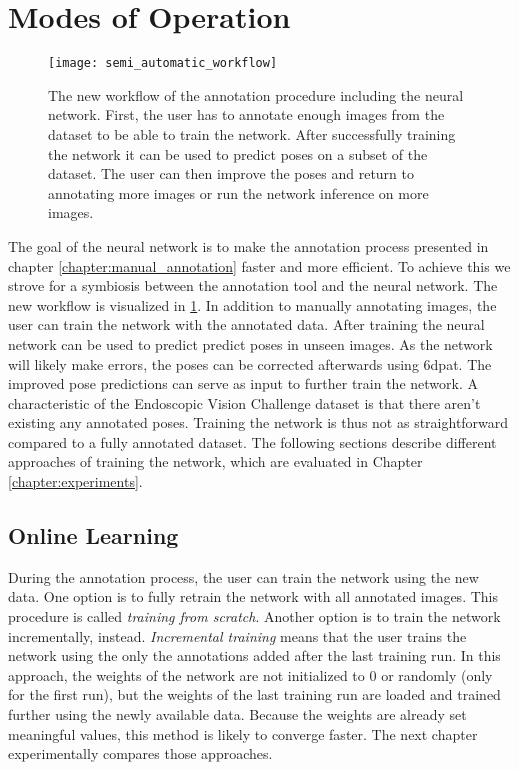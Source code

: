 \section{Modes of Operation} \label{section:modes_of_operation}

\begin{figure}[!tbp]
	\centering
    \texttt{[image: semi\_automatic\_workflow]}
    \caption{The new workflow of the annotation procedure including the neural network. First, the user has to annotate enough images from the dataset to be able to train the network. After successfully training the network it can be used to predict poses on a subset of the dataset. The user can then improve the poses and return to annotating more images or run the network inference on more images.}
    	\label{fig:semi_automatic_workflow}
\end{figure}

The goal of the neural network is to make the annotation process presented in chapter \ref{chapter:manual_annotation} faster and more efficient. To achieve this we strove for a symbiosis between the annotation tool and the neural network. The new workflow is visualized in \fig \ref{fig:semi_automatic_workflow}. In addition to manually annotating images, the user can train the network with the annotated data. After training the neural network can be used to predict predict poses in unseen images. As the network will likely make errors, the poses can be corrected afterwards using \ac{6dpat}. The improved pose predictions can serve as input to further train the network. A characteristic of the Endoscopic Vision Challenge dataset is that there aren't existing any annotated poses. Training the network is thus not as straightforward compared to a fully annotated dataset. The following sections describe different approaches of training the network, which are evaluated in Chapter \ref{chapter:experiments}.


\subsection{Online Learning}

During the annotation process, the user can train the network using the new data. One option is to fully retrain the network with all  annotated images. This procedure is called \textit{training from scratch}. Another option is to train the network incrementally, instead. \textit{Incremental training} means that the user trains the network using the only the annotations added after the last training run. In this approach, the weights of the network are not initialized to 0 or randomly (only for the first run), but the weights of the last training run are loaded and trained further using the newly available data. Because the weights are already set meaningful values, this method is likely to converge faster. The next chapter experimentally compares those approaches.

